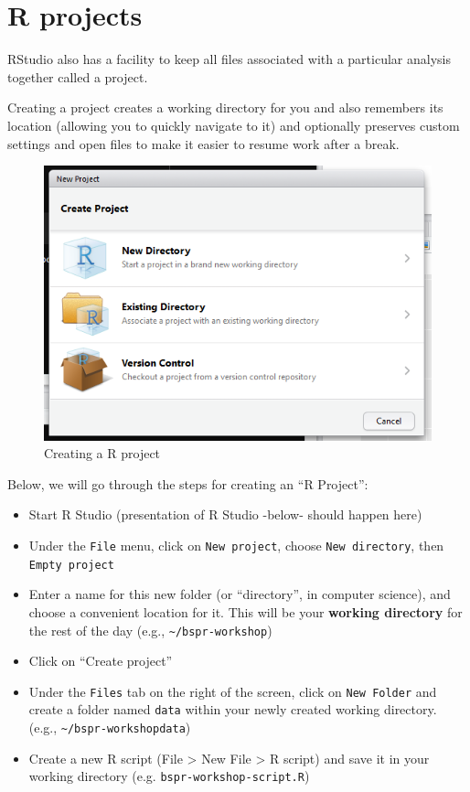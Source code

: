 \documentclass[12pt,]{book}
\providecommand{\tightlist}{%
  \setlength{\itemsep}{0pt}\setlength{\parskip}{0pt}}
\theoremstyle{definition}
\theoremstyle{definition}
\theoremstyle{definition}
\theoremstyle{remark}
\begin{document}
\section{R projects}\label{r-projects}

RStudio also has a facility to keep all files associated with a
particular analysis together called a project.

Creating a project creates a working directory for you and also
remembers its location (allowing you to quickly navigate to it) and
optionally preserves custom settings and open files to make it easier to
resume work after a break.



\begin{figure}

{\centering \includegraphics[width=0.8\linewidth]{img/rstudio_create_project} 

}

\caption{Creating a R project}\label{fig:r-projects}
\end{figure}

Below, we will go through the steps for creating an ``R Project'':

\begin{itemize}
\tightlist
\item
  Start R Studio (presentation of R Studio -below- should happen here)
\item
  Under the \texttt{File} menu, click on \texttt{New\ project}, choose
  \texttt{New\ directory}, then \texttt{Empty\ project}
\item
  Enter a name for this new folder (or ``directory'', in computer
  science), and choose a convenient location for it. This will be your
  \textbf{working directory} for the rest of the day (e.g.,
  \texttt{\textasciitilde{}/bspr-workshop})
\item
  Click on ``Create project''
\item
  Under the \texttt{Files} tab on the right of the screen, click on
  \texttt{New\ Folder} and create a folder named \texttt{data} within
  your newly created working directory. (e.g.,
  \texttt{\textasciitilde{}/bspr-workshopdata})
\item
  Create a new R script (File \textgreater{} New File \textgreater{} R
  script) and save it in your working directory (e.g.
  \texttt{bspr-workshop-script.R})
\end{itemize}
\end{document}
